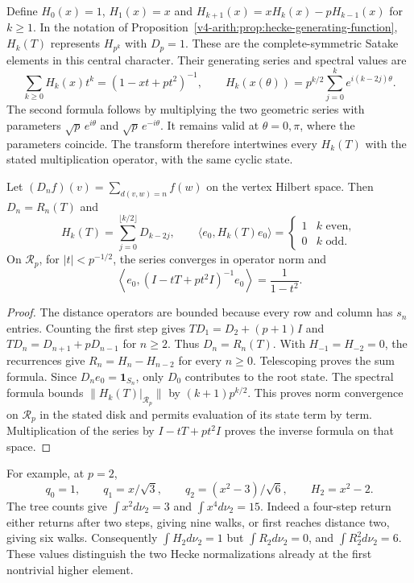 Define $H_0(x)=1$, $H_1(x)=x$ and
$H_{k+1}(x)=xH_k(x)-pH_{k-1}(x)$ for $k\ge1$.
In the notation of Proposition~\ref{v4-arith:prop:hecke-generating-function},
$H_k(T)$ represents $H_{p^k}$ with $D_p=1$. These are the
complete-symmetric Satake elements in this central character. Their generating series and spectral values are
\[
 \sum_{k\ge0}H_k(x)t^k=(1-xt+pt^2)^{-1},\qquad
 H_k(x(\theta))=p^{k/2}\sum_{j=0}^ke^{i(k-2j)\theta}.
\]
The second formula follows by multiplying the two geometric series
with parameters $\sqrt p\,e^{i\theta}$ and $\sqrt p\,e^{-i\theta}$.
It remains valid at $\theta=0,\pi$, where the parameters coincide.
The transform therefore intertwines every $H_k(T)$ with the stated
multiplication operator, with the same cyclic state.

\begin{proposition}
\label{v4-arith:radial:distance}
Let $(D_nf)(v)=\sum_{d(v,w)=n}f(w)$ on the vertex Hilbert space.
Then $D_n=R_n(T)$ and
\[
 H_k(T)=\sum_{j=0}^{\lfloor k/2\rfloor}D_{k-2j},\qquad
 \langle e_0,H_k(T)e_0\rangle=
 \begin{cases}1&k\text{ even},\\0&k\text{ odd}.\end{cases}
\]
On $\mathcal R_p$, for $|t|<p^{-1/2}$, the series converges in operator norm and
\[
 \left\langle e_0,(I-tT+pt^2I)^{-1}e_0\right\rangle
 =\frac1{1-t^2}.
\]
\end{proposition}
\begin{proof}
The distance operators are bounded because every row and column has
$s_n$ entries. Counting the first step gives
$TD_1=D_2+(p+1)I$ and
$TD_n=D_{n+1}+pD_{n-1}$ for $n\ge2$. Thus $D_n=R_n(T)$.
With $H_{-1}=H_{-2}=0$, the recurrences give
$R_n=H_n-H_{n-2}$ for every $n\ge0$.
Telescoping proves the sum formula. Since $D_ne_0=\mathbf{1}_{S_n}$,
only $D_0$ contributes to the root state.
The spectral formula bounds $\|H_k(T)|_{\mathcal R_p}\|$
by $(k+1)p^{k/2}$. This proves norm convergence on $\mathcal R_p$
in the stated disk and permits evaluation of its state term by term.
Multiplication of the series by $I-tT+pt^2I$ proves the inverse formula
on that space.
\end{proof}

For example, at $p=2$,
\[
 q_0=1,\qquad q_1=x/\sqrt3,\qquad
 q_2=(x^2-3)/\sqrt6,\qquad H_2=x^2-2.
\]
The tree counts give
$\int x^2d\nu_2=3$ and $\int x^4d\nu_2=15$.
Indeed a four-step return either returns after two steps, giving nine
walks, or first reaches distance two, giving six walks.
Consequently $\int H_2d\nu_2=1$ but $\int R_2d\nu_2=0$,
and $\int R_2^2d\nu_2=6$. These values distinguish the two Hecke
normalizations already at the first nontrivial higher element.

